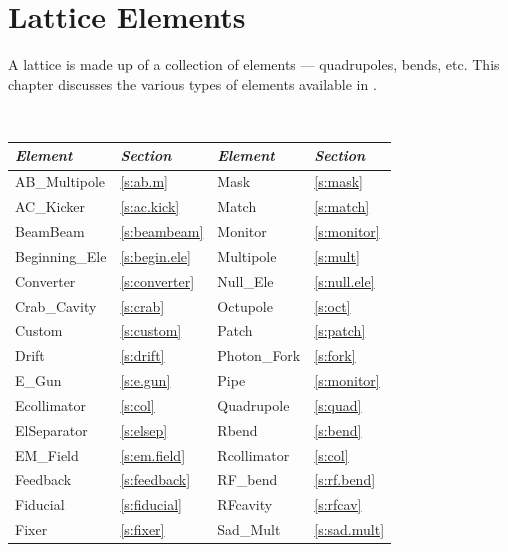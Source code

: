 \chapter{Lattice Elements}
\label{c:elements}

A lattice is made up of a collection of elements --- quadrupoles,
bends, etc. This chapter discusses the various types of elements
available in \bmad.

\begin{table}[htb]
\centering
{\tt
\begin{tabular}{llll} \toprule
  {\it Element}     & {\it Section}         & {\it Element}      & {\it Section}      \\ \midrule
  AB_Multipole      & \ref{s:ab.m}          &  Mask              & \ref{s:mask}       \\
  AC_Kicker         & \ref{s:ac.kick}       &  Match             & \ref{s:match}      \\
  BeamBeam          & \ref{s:beambeam}      &  Monitor           & \ref{s:monitor}    \\
  Beginning_Ele     & \ref{s:begin.ele}     &  Multipole         & \ref{s:mult}       \\
  Converter         & \ref{s:converter}     &  Null_Ele          & \ref{s:null.ele}   \\
  Crab_Cavity       & \ref{s:crab}          &  Octupole          & \ref{s:oct}        \\
  Custom            & \ref{s:custom}        &  Patch             & \ref{s:patch}      \\
  Drift             & \ref{s:drift}         &  Photon_Fork       & \ref{s:fork}       \\
  E_Gun             & \ref{s:e.gun}         &  Pipe              & \ref{s:monitor}    \\
  Ecollimator       & \ref{s:col}           &  Quadrupole        & \ref{s:quad}       \\
  ElSeparator       & \ref{s:elsep}         &  Rbend             & \ref{s:bend}       \\
  EM_Field          & \ref{s:em.field}      &  Rcollimator       & \ref{s:col}        \\
  Feedback          & \ref{s:feedback}      &  RF_bend           & \ref{s:rf.bend}    \\
  Fiducial          & \ref{s:fiducial}      &  RFcavity          & \ref{s:rfcav}      \\
  Fixer             & \ref{s:fixer}         &  Sad_Mult          & \ref{s:sad.mult}   \\

\end{tabular}}
\end{table}
